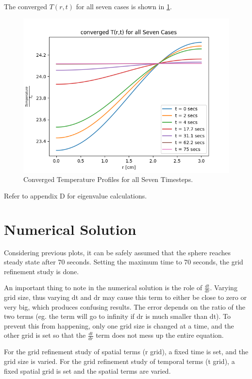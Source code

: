 \documentclass[12pt,letterpaper]{article}
\begin{document}
The converged $T(r,t)$ for all seven cases is shown in \cref{fig:conv}.

\begin{figure}[htbp!]
  \begin{center}
    \includegraphics[scale=0.7]{converged.png}
  \end{center}
  \caption{Converged Temperature Profiles for all Seven Timesteps.}
  \label{fig:conv}
\end{figure}

Refer to appendix D for eigenvalue calculations.


\pagebreak

\section*{Numerical Solution}

Considering previous plots, it can be safely assumed that the sphere
reaches steady state after 70 seconds. Setting the maximum time to 70
seconds, the grid refinement study is done.

An important thing to note in the numerical solution is the role of
$\frac{dt}{dr}$. Varying grid size, thus varying dt and dr may cause
this term to either be close to zero or very big, which produces 
confusing results. The error depends on the ratio of the two 
terms (eg. the term will go to infinity if dr is much smaller
than dt). To prevent this from happening, only one grid size is 
changed at a time, and the other grid is set so that the $\frac{dt}{dr}$
term does not mess up the entire equation.

For the grid refinement study of spatial terms (r grid), a fixed 
time is set, and the grid size is varied. For the grid refinement
study of temporal terms (t grid), a fixed spatial grid is set
and the spatial terms are varied.
\end{document}
